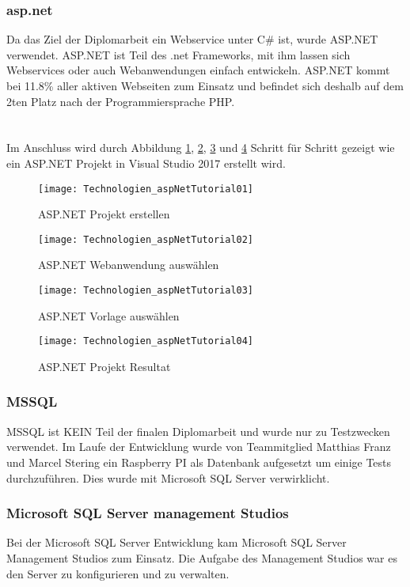\subsubsection {asp.net}
\label{sec:asp.net}
Da das Ziel der Diplomarbeit ein Webservice unter C\# ist, wurde ASP.NET verwendet. ASP.NET ist Teil des .net Frameworks, mit ihm lassen sich Webservices oder auch Webanwendungen einfach entwickeln. ASP.NET kommt bei 11.8\% aller aktiven Webseiten zum Einsatz und befindet sich deshalb auf dem 2ten Platz nach der Programmiersprache PHP. \\ \textcite{aspnetstatistik} \\
\\ Im Anschluss wird durch Abbildung \ref{fig:aspNetTut01}, \ref{fig:aspNetTut02}, \ref{fig:aspNetTut03} und \ref{fig:aspNetTut04} Schritt für Schritt gezeigt wie ein ASP.NET Projekt in Visual Studio 2017 erstellt wird.
\begin{figure}[h]
    \texttt{[image: Technologien\_aspNetTutorial01]}
    \caption{ASP.NET Projekt erstellen}
    \label{fig:aspNetTut01}
\end{figure}
\begin{figure}[h]
    \texttt{[image: Technologien\_aspNetTutorial02]}
    \caption{ASP.NET Webanwendung auswählen}
    \label{fig:aspNetTut02}
\end{figure}
\begin{figure}[H]
    \texttt{[image: Technologien\_aspNetTutorial03]}
    \caption{ASP.NET Vorlage auswählen}
    \label{fig:aspNetTut03}
\end{figure}
\begin{figure}[h]
    \texttt{[image: Technologien\_aspNetTutorial04]}
    \caption{ASP.NET Projekt Resultat}
    \label{fig:aspNetTut04}
\end{figure}
\subsubsection {MSSQL}
\label{sec:MSSQL}
MSSQL ist KEIN Teil der finalen Diplomarbeit und wurde nur zu Testzwecken verwendet. Im Laufe der Entwicklung wurde von Teammitglied Matthias Franz und Marcel Stering ein Raspberry PI als Datenbank aufgesetzt um einige Tests durchzuführen. Dies wurde mit Microsoft SQL Server verwirklicht. 
\subsubsection {Microsoft SQL Server management Studios}
\label{sec:mssql-server-management-studio}
Bei der Microsoft SQL Server Entwicklung kam Microsoft SQL Server Management Studios zum Einsatz. Die Aufgabe des Management Studios war es den Server zu konfigurieren und zu verwalten. 
